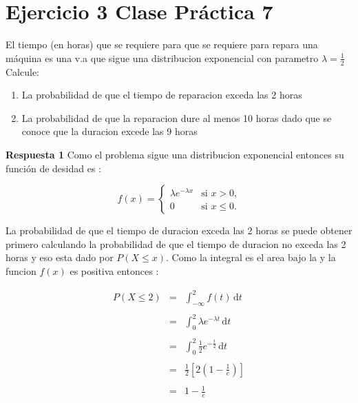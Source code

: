 \documentclass{article}
\begin{document}
            




    \section*{Ejercicio 3 Clase Pr\'actica 7}

    El tiempo (en horas) que se requiere para que se requiere para repara una m\'aquina es una v.a 
    que sigue una distribucion exponencial con parametro $ \lambda = \frac{1}{2} $ Calcule: 
    \begin{enumerate}
        \item La probabilidad de que el tiempo de reparacion exceda las 2 horas 
        \item La probabilidad de que la reparacion dure al menos 10 horas dado que se conoce que
         la duracion excede las 9 horas 
    \end{enumerate} 
    
    {\bf Respuesta 1 } 
    Como el problema sigue una distribucion exponencial entonces su funci\'on de desidad es : 

    
    \begin{equation*}
        f(x)=\begin{cases}
            \lambda e^{-\lambda x }  & \mbox{si $x>0$,}
            \\
            0                        & \mbox{si $x\le 0$.}
            \end{cases}
    \end{equation*}

    La probabilidad de que el tiempo de duracion exceda las 2 horas se 
    puede obtener primero calculando la probabilidad de que el tiempo de 
    duracion no exceda las 2 horas  y eso esta dado por $P \left(X \le x\right)$. 
    Como la integral es el area bajo la y la funcion $f\left(x\right) $ es positiva 
    entonces : 
    


    \begin{equation*}
        \begin{matrix}
            P \left(X \le 2 \right) & = & \int_{ - \infty   }^{2}  f\left(t\right)\,\mathrm{d}t
            \\\\
                                    & = & \int_{0 }^{2}  \lambda e^{- \lambda t}\,\mathrm{d}t
            \\\\
                                    & = & \int_{0 }^{2}  \frac{1}{2} e^{- \frac{t}{2} }\,\mathrm{d}t
            \\\\
                                    & = & \frac{1}{2} \left[2 \left(1-\frac{1}{e}\right)\right]
            \\\\
                                    & = & 1 - \frac{1}{e}
        \end{matrix}
    \end{equation*}
    
\end{document}
